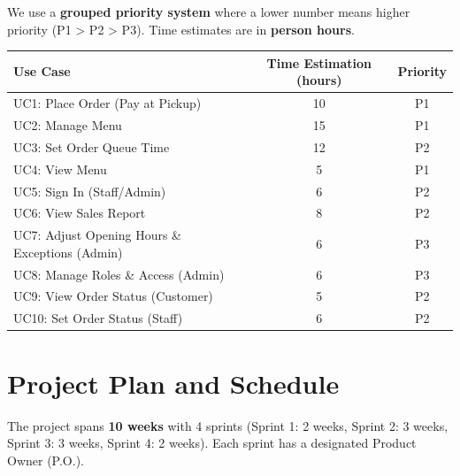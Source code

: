 \documentclass{article}
\begin{document}
We use a \textbf{grouped priority system} where a lower number means higher priority (P1 > P2 > P3).
Time estimates are in \textbf{person hours}.

\begin{center}
\begin{adjustbox}{max width=\textwidth}
\begin{tabular}{|l|c|c|}
\hline
\textbf{Use Case} & \textbf{Time Estimation (hours)} & \textbf{Priority} \\ \hline
UC1: Place Order (Pay at Pickup)                 & 10 & P1 \\ \hline
UC2: Manage Menu                                 & 15 & P1 \\ \hline
UC3: Set Order Queue Time                        & 12 & P2 \\ \hline
UC4: View Menu                                   & 5  & P1 \\ \hline
UC5: Sign In (Staff/Admin)                       & 6  & P2 \\ \hline
UC6: View Sales Report                           & 8  & P2 \\ \hline
UC7: Adjust Opening Hours \& Exceptions (Admin)  & 6  & P3 \\ \hline
UC8: Manage Roles \& Access (Admin)              & 6  & P3 \\ \hline
UC9: View Order Status (Customer)                & 5  & P2 \\ \hline
UC10: Set Order Status (Staff)                   & 6  & P2 \\ \hline
\end{tabular}
\end{adjustbox}
\end{center}

\section{Project Plan and Schedule}

The project spans \textbf{10 weeks} with 4 sprints (Sprint 1: 2 weeks, Sprint 2: 3 weeks, Sprint 3: 3 weeks, Sprint 4: 2 weeks).
Each sprint has a designated Product Owner (P.O.).
\end{document}
